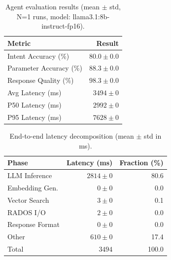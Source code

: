 
\begin{table}[t]
\centering
\caption{Agent evaluation results (mean $\pm$ std, N=1 runs, model: llama3.1:8b-instruct-fp16).}
\label{tab:eval-results}
\begin{tabular}{lr}
\toprule
\textbf{Metric} & \textbf{Result} \\
\midrule
Intent Accuracy (\%) & $80.0 \pm 0.0$ \\
Parameter Accuracy (\%) & $88.3 \pm 0.0$ \\
Response Quality (\%) & $98.3 \pm 0.0$ \\
\midrule
Avg Latency (ms) & $3494 \pm 0$ \\
P50 Latency (ms) & $2992 \pm 0$ \\
P95 Latency (ms) & $7628 \pm 0$ \\
\bottomrule
\end{tabular}
\end{table}


\begin{table}[t]
\centering
\caption{End-to-end latency decomposition (mean $\pm$ std in ms).}
\label{tab:latency-decomp}
\begin{tabular}{lrr}
\toprule
\textbf{Phase} & \textbf{Latency (ms)} & \textbf{Fraction (\%)} \\
\midrule
LLM Inference & $2814 \pm 0$ & 80.6 \\
Embedding Gen. & $0 \pm 0$ & 0.0 \\
Vector Search & $3 \pm 0$ & 0.1 \\
RADOS I/O & $2 \pm 0$ & 0.0 \\
Response Format & $0 \pm 0$ & 0.0 \\
Other & $610 \pm 0$ & 17.4 \\
\midrule
Total & $3494$ & 100.0 \\
\bottomrule
\end{tabular}
\end{table}
